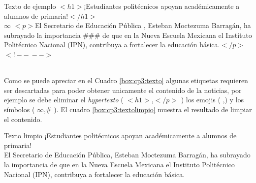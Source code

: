 \begin{mygraybox}[label={box:cp3:texto}]{Texto de ejemplo} 
$<h1>$¡Estudiantes politécnicos apoyan académicamente a alumnos de primaria!$</h1>$\\

$\infty$
$<p>$El Secretario de Educación Pública \Tribar[1][blue][blue!50][blue!20], Esteban Moctezuma Barragán, ha subrayado la importancia \#\#\# de que en la Nueva Escuela Mexicana el Instituto Politécnico Nacional (IPN)\dSmiley, contribuya a fortalecer la educación básica.$</p>$\\
$<!--\ -->$
\end{mygraybox}
\ \\
Como se puede apreciar en el Cuadro \ref{box:cp3:texto} algunas etiquetas requieren ser descartadas para poder obtener unicamente el contenido de la noticias, por ejemplo se debe eliminar el \textit{hypertexto} ( $<h1>$,$</p>$ ) los emojis ( \dSmiley,\Tribar[1][blue][blue!50][blue!20] ) y los símbolos ( $\infty$,\# ). El cuadro \ref{box:cp3:textolimpio} muestra el resultado de limpiar el contenido.\\

\begin{mygraybox}[label={box:cp3:textolimpio}]{Texto limpio} 
¡Estudiantes politécnicos apoyan académicamente a alumnos de primaria!\\

El Secretario de Educación Pública, Esteban Moctezuma Barragán, ha subrayado la importancia  de que en la Nueva Escuela Mexicana el Instituto Politécnico Nacional (IPN), contribuya a fortalecer la educación básica.
\end{mygraybox}



